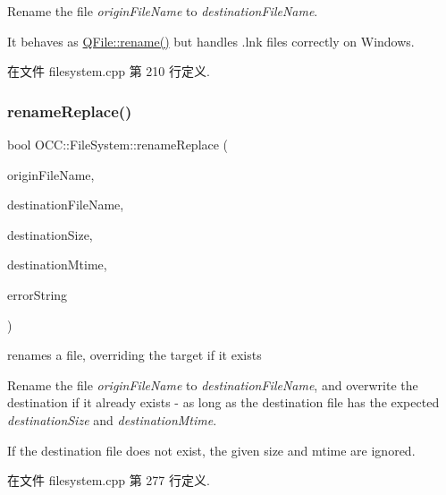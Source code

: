 Rename the file {\itshape origin\+File\+Name} to {\itshape destination\+File\+Name}. 

It behaves as \hyperlink{namespace_o_c_c_1_1_file_system_a8aecdf1d35430c2d0e9b8c6d274c71dc}{Q\+File\+::rename()} but handles .lnk files correctly on Windows. 

在文件 filesystem.\+cpp 第 210 行定义.

\mbox{\label{namespace_o_c_c_1_1_file_system_a54dd5dc2b7a3c50220a3e2a38697bd6f}} 
\subsubsection{\texorpdfstring{rename\+Replace()}{renameReplace()}}
{\footnotesize\ttfamily bool O\+C\+C\+::\+File\+System\+::rename\+Replace (\begin{DoxyParamCaption}\item[{const Q\+String \&}]{origin\+File\+Name,  }\item[{const Q\+String \&}]{destination\+File\+Name,  }\item[{qint64}]{destination\+Size,  }\item[{time\+\_\+t}]{destination\+Mtime,  }\item[{Q\+String $\ast$}]{error\+String }\end{DoxyParamCaption})}



renames a file, overriding the target if it exists 

Rename the file {\itshape origin\+File\+Name} to {\itshape destination\+File\+Name}, and overwrite the destination if it already exists -\/ as long as the destination file has the expected {\itshape destination\+Size} and {\itshape destination\+Mtime}.

If the destination file does not exist, the given size and mtime are ignored. 

在文件 filesystem.\+cpp 第 277 行定义.

\mbox{\label{namespace_o_c_c_1_1_file_system_a7c843b229f6b4c70bd2b4369d7856db4}} 
